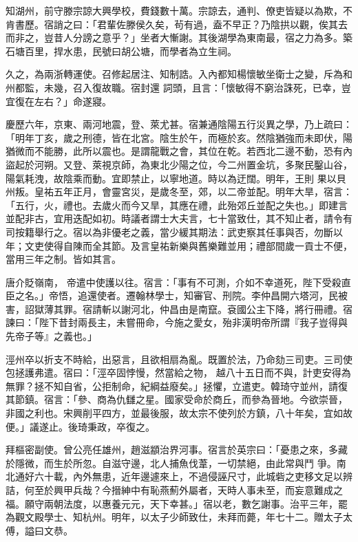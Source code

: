 \begin{pinyinscope}
 知湖州，前守滕宗諒大興學校，費錢數十萬。宗諒去，通判、僚吏皆疑以為欺，不肯書歷。宿誚之曰：「君輩佐滕侯久矣，茍有過，盍不早正？乃陰拱以觀，俟其去而非之，豈昔人分謗之意乎？」坐者大慚謝。其後湖學為東南最，宿之力為多。築石塘百里，捍水患，民號曰胡公塘，而學者為立生祠。



 久之，為兩浙轉運使。召修起居注、知制誥。入內都知楊懷敏坐衛士之變，斥為和州都監，未幾，召入復故職。宿封還
 詞頭，且言：「懷敏得不窮治誅死，已幸，豈宜復在左右？」命遂寢。



 慶歷六年，京東、兩河地震，登、萊尤甚。宿兼通陰陽五行災異之學，乃上疏曰：「明年丁亥，歲之刑德，皆在北宮。陰生於午，而極於亥。然陰猶強而未即伏，陽猶微而不能勝，此所以震也。是謂龍戰之會，其位在乾。若西北二邊不動，恐有內盜起於河朔。又登、萊視京師，為東北少陽之位，今二州置金坑，多聚民鑿山谷，陽氣耗洩，故陰乘而動。宜即禁止，以寧地道。時以為迂闊。明年，王則
 果以貝州叛。皇祐五年正月，會靈宮災，是歲冬至，郊，以二帝並配。明年大旱，宿言：「五行，火，禮也。去歲火而今又旱，其應在禮，此殆郊丘並配之失也。」即建言並配非古，宜用迭配如初。時議者謂士大夫言，七十當致仕，其不知止者，請令有司按籍舉行之。宿以為非優老之義，當少緩其期法：武吏察其任事與否，勿斷以年；文吏使得自陳而全其節。及言皇祐新樂與舊樂難並用；禮部間歲一貢士不便，當用三年之制。皆如其言。



 唐介貶嶺南，
 帝遣中使護以往。宿言：「事有不可測，介如不幸道死，陛下受殺直臣之名。」帝悟，追還使者。遷翰林學士，知審官、刑院。李仲昌開六塔河，民被害，詔獄薄其罪。宿請斬以謝河北，仲昌由是南竄。袞國公主下降，將行冊禮。宿諫曰：「陛下昔封兩長主，未嘗冊命，今施之愛女，殆非漢明帝所謂『我子豈得與先帝子等』之義也。」



 涇州卒以折支不時給，出惡言，且欲相扇為亂。既置於法，乃命劾三司吏。三司使包拯護弗遣。宿曰：「涇卒固悖慢，然當給之物，
 越八十五日而不與，計吏安得為無罪？拯不知自省，公拒制命，紀綱益廢矣。」拯懼，立遣吏。韓琦守並州，請復其節鎮。宿言：「參、商為仇讎之星。國家受命於商丘，而參為晉地。今欲崇晉，非國之利也。宋興削平四方，並最後服，故太宗不使列於方鎮，八十年矣，宜如故便。」議遂止。後琦秉政，卒復之。



 拜樞密副使。曾公亮任雄州，趙滋顓治界河事。宿言於英宗曰：「憂患之來，多藏於隱微，而生於所忽。自滋守邊，北人捕魚伐葦，一切禁絕，由此常與鬥
 爭。南北通好六十載，內外無患，近年邊遽來上，不過侵誣尺寸，此城砦之吏移文足以辨詰，何至於興甲兵哉？今搢紳中有恥燕薊外屬者，天時人事未至，而妄意難成之福。願守兩朝法度，以惠養元元，天下幸甚。」宿以老，數乞謝事。治平三年，罷為觀文殿學士、知杭州。明年，以太子少師致仕，未拜而薨，年七十二。贈太子太傅，謚曰文恭。




\end{pinyinscope}
